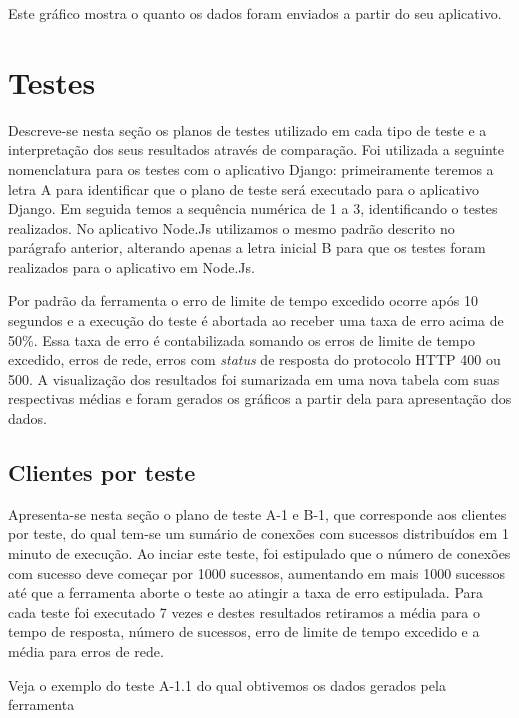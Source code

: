  Este gráfico mostra o quanto os dados foram enviados a partir do seu aplicativo.


\section{Testes}

  Descreve-se nesta seção os planos de testes utilizado em cada tipo de teste e a interpretação dos seus resultados
  através de comparação.
  Foi utilizada a seguinte nomenclatura para os testes com o aplicativo Django: primeiramente teremos a letra A para identificar
  que o plano de teste será executado para o aplicativo Django. Em seguida temos a sequência numérica de 1 a 3,
  identificando o testes realizados.
  No aplicativo Node.Js utilizamos o mesmo padrão descrito no parágrafo anterior, alterando apenas a letra inicial B para que os testes
  foram realizados para o aplicativo em Node.Js.

  Por padrão da ferramenta o erro de limite de tempo excedido ocorre após 10 segundos e a execução do teste é abortada
  ao receber uma taxa de erro acima de 50\%. Essa taxa de erro é contabilizada somando os erros de limite de tempo excedido, erros de
  rede, erros com \textit{status} de resposta do protocolo \ac{HTTP} 400 ou 500.
  A visualização dos resultados foi sumarizada em uma nova tabela com suas respectivas médias e foram gerados os gráficos a partir dela para apresentação dos
  dados.

\subsection{Clientes por teste}

  Apresenta-se nesta seção o plano de teste A-1 e B-1, que corresponde aos clientes por teste,  do qual tem-se um sumário
  de conexões com sucessos distribuídos em 1 minuto de execução.
  Ao inciar este teste, foi estipulado que o número de conexões com sucesso deve começar por 1000 sucessos, aumentando
  em mais 1000 sucessos até que a ferramenta aborte o teste ao atingir a taxa de erro estipulada. Para cada teste
  foi executado 7 vezes e destes resultados retiramos a média para o tempo de resposta, número de sucessos, erro de limite de tempo excedido
  e a média para erros de rede.

  Veja o exemplo do teste A-1.1 do qual obtivemos os dados gerados pela ferramenta

